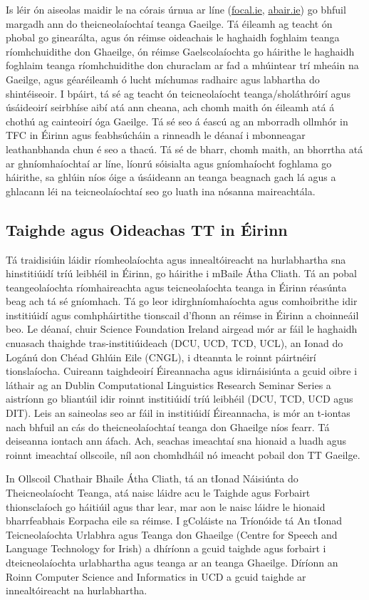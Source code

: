 \begin{multicols}{2}
Is léir ón aiseolas maidir le na córais úrnua ar líne (\url{focal.ie}, \url{abair.ie}) go bhfuil margadh ann do theicneolaíochtaí teanga Gaeilge. Tá éileamh ag teacht ón phobal go ginearálta, agus ón réimse oideachais le haghaidh foghlaim teanga ríomhchuidithe don Ghaeilge, ón réimse Gaelscolaíochta go háirithe le haghaidh foghlaim teanga ríomhchuidithe don churaclam ar fad a mhúintear trí mheáin na Gaeilge, agus géaréileamh ó lucht míchumas radhairc agus labhartha do shintéiseoir. I bpáirt, tá sé ag teacht ón teicneolaíocht teanga/sholáthróirí agus úsáideoirí seirbhíse aibí atá ann cheana, ach chomh maith ón éileamh atá á chothú ag cainteoirí óga Gaeilge. Tá sé seo á éascú ag an mborradh ollmhór in TFC in Éirinn agus feabhsúcháin a rinneadh le déanaí i mbonneagar leathanbhanda chun é seo a thacú. Tá sé de bharr, chomh maith, an bhorrtha atá ar ghníomhaíochtaí ar líne, líonrú sóisialta agus gníomhaíocht foghlama go háirithe, sa ghlúin níos óige a úsáideann an teanga beagnach gach lá agus a ghlacann léi na teicneolaíochtaí seo go luath ina nósanna maireachtála.

\subsection{Taighde agus Oideachas TT in Éirinn}

Tá traidisiúin láidir ríomheolaíochta agus innealtóireacht na hurlabhartha sna hinstitiúidí tríú leibhéil in Éirinn, go háirithe i mBaile Átha Cliath. Tá an pobal teangeolaíochta ríomhaireachta agus teicneolaíochta teanga in Éirinn réasúnta beag ach tá sé gníomhach. Tá go leor idirghníomhaíochta agus comhoibrithe idir institiúidí agus comhpháirtithe tionscail d'fhonn an réimse in Éirinn a choinneáil beo. Le déanaí, chuir Science Foundation Ireland airgead mór ar fáil le haghaidh cnuasach thaighde tras-institiúideach (DCU, UCD, TCD, UCL), an Ionad do Logánú don Chéad Ghlúin Eile (CNGL), i  dteannta le roinnt páirtnéirí tionslaíocha. Cuireann taighdeoirí Éireannacha agus idirnáisiúnta a gcuid oibre i láthair ag an Dublin Computational Linguistics Research Seminar Series a aistríonn go bliantúil idir roinnt institiúidí tríú leibhéil (DCU, TCD, UCD agus DIT). Leis an saineolas seo ar fáil in institiúidí Éireannacha, is mór an t-iontas nach bhfuil an cás do theicneolaíochtaí teanga don Ghaeilge níos fearr. Tá deiseanna iontach ann áfach. Ach, seachas imeachtaí sna hionaid a luadh agus roinnt imeachtaí ollscoile, níl aon chomhdháil nó imeacht pobail don TT Gaeilge.

In Ollscoil Chathair Bhaile Átha Cliath, tá an tIonad Náisiúnta do Theicneolaíocht Teanga, atá naisc láidre acu le Taighde agus Forbairt thionsclaíoch go háitiúil agus thar lear, mar aon le naisc láidre le hionaid bharrfeabhais Eorpacha eile sa réimse. I gColáiste na Tríonóide tá An tIonad Teicneolaíochta Urlabhra agus Teanga don Ghaeilge (Centre for Speech and Language Technology for Irish) a dhíríonn a gcuid taighde agus forbairt i dteicneolaíochta urlabhartha agus teanga ar an teanga Ghaeilge. Díríonn an Roinn Computer Science and Informatics in UCD a gcuid taighde ar innealtóireacht na hurlabhartha.


\end{multicols}
